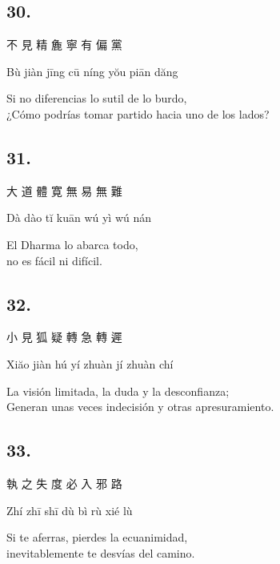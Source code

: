 \documentclass[
  a5paperpaper,
]{article}
\begin{document}
\begin{verseblock}

\hypertarget{section-104}{%
\subsection{30.}\label{section-104}}

不 見 精 麁 寧 有 偏 黨

Bù jiàn jīng cū níng yŏu piān dăng

Si no diferencias lo sutil de lo burdo,\\
¿Cómo podrías tomar partido hacia uno de los lados?

\end{verseblock}

\begin{verseblock}

\hypertarget{section-105}{%
\subsection{31.}\label{section-105}}

大 道 體 寛 無 易 無 難

Dà dào tĭ kuān wú yì wú nán

El Dharma lo abarca todo,\\
no es fácil ni difícil.

\end{verseblock}

\begin{verseblock}

\hypertarget{section-106}{%
\subsection{32.}\label{section-106}}

小 見 狐 疑 轉 急 轉 遲

Xiăo jiàn hú yí zhuàn jí zhuàn chí

La visión limitada, la duda y la desconfianza;\\
Generan unas veces indecisión y otras apresuramiento.

\end{verseblock}

\begin{verseblock}

\hypertarget{section-107}{%
\subsection{33.}\label{section-107}}

執 之 失 度 必 入 邪 路

Zhí zhī shī dù bì rù xié lù

Si te aferras, pierdes la ecuanimidad,\\
inevitablemente te desvías del camino.

\end{verseblock}
\end{document}
